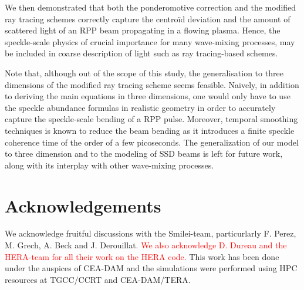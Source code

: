 \documentclass[%
 reprint,
 amsmath,amssymb,
 aps,
]{revtex4-1}
\begin{document}
We then demonstrated that both the ponderomotive correction and the modified ray tracing schemes correctly capture the centro\"id deviation and the amount of scattered light of an RPP beam propagating in a flowing plasma. Hence, the speckle-scale physics of crucial importance for many wave-mixing processes, may be included in coarse description of light such as  ray tracing-based schemes. 

Note that, although out of the scope of this study, the generalisation to three dimensions of the modified ray tracing scheme seems feasible. Na\"ively, in addition to deriving the main equations in three dimensions, one would only have to use the speckle abundance formulas in realistic geometry in order to accurately capture the speckle-scale bending of a RPP  pulse. 
Moreover, temporal  smoothing techniques is known to reduce the beam bending as it introduces a finite speckle coherence time of the order of a few picoseconds. The generalization of our model to three dimension and to the  modeling of SSD beams is left for future work, along with its interplay with other wave-mixing processes.

\section*{Acknowledgements}
We acknowledge fruitful discussions with the  Smilei-team, particurlarly  F. Perez, M. Grech, A. Beck and J. Derouillat.
 \textcolor{red}{We also acknowledge D. Dureau and the HERA-team for all their work on the HERA code. }
This work has been done under  the auspices of  CEA-DAM and
the simulations were performed using HPC resources at TGCC/CCRT and CEA-DAM/TERA.

\end{document}
